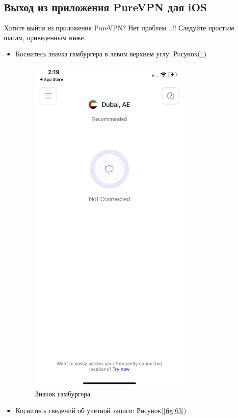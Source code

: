 \subsection{Выход из приложения PureVPN для iOS} 
Хотите выйти из приложения PureVPN? Нет проблем ..!! Следуйте простым шагам, приведенным ниже.
\begin{itemize}
\item Коснитесь значка гамбургера в левом верхнем углу:  Рисунок(\ref{fig:62})
\begin{figure}[H]
\includegraphics[width=8cm]{47.png}
\centering
\caption{Значок гамбургера}
\label{fig:62}
\end{figure}
\item Коснитесь сведений об учетной записи:  Рисунок(\ref{fig:63})
\begin{figure}[H]

\end{figure}
\end{itemize}
